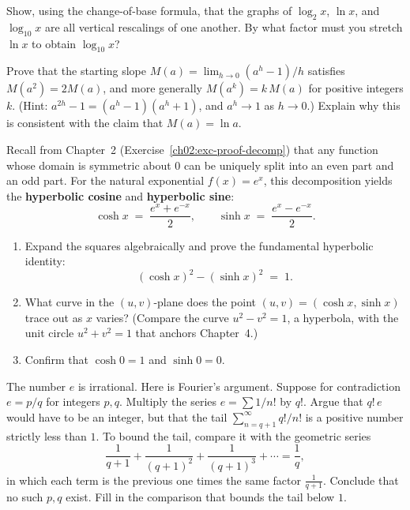 \begin{exercise}
\label{ch03:exc-change-base}
Show, using the change-of-base formula, that the graphs of $\log_2 x$, $\ln x$, and $\log_{10}x$ are all vertical rescalings of one another. By what factor must you stretch $\ln x$ to obtain $\log_{10}x$?
\end{exercise}

\begin{exercise}
\label{ch03:exc-proof-slope}
Prove that the starting slope $M(a)=\lim_{h\to0}(a^h-1)/h$ satisfies $M(a^2)=2M(a)$, and more generally $M(a^k)=k\,M(a)$ for positive integers $k$. (Hint: $a^{2h}-1 = (a^h-1)(a^h+1)$, and $a^h\to 1$ as $h\to 0$.) Explain why this is consistent with the claim that $M(a)=\ln a$.
\end{exercise}

\begin{exercise}
\label{ch03:exc-hyperbolic}
Recall from Chapter~2 (Exercise~\ref{ch02:exc-proof-decomp}) that any function whose domain is symmetric about $0$ can be uniquely split into an even part and an odd part. For the natural exponential $f(x) = e^x$, this decomposition yields the \textbf{hyperbolic cosine} and \textbf{hyperbolic sine}:
\[
\cosh x \;=\; \frac{e^x + e^{-x}}{2}, \qquad \sinh x \;=\; \frac{e^x - e^{-x}}{2}.
\]
\begin{enumerate}[label=(\alph*)]
  \item Expand the squares algebraically and prove the fundamental hyperbolic identity:
  \[
  (\cosh x)^2 - (\sinh x)^2 \;=\; 1.
  \]
  \item What curve in the $(u,v)$-plane does the point $(u,v) = (\cosh x, \sinh x)$ trace out as $x$ varies? (Compare the curve $u^2 - v^2 = 1$, a hyperbola, with the unit circle $u^2 + v^2 = 1$ that anchors Chapter~4.)
  \item Confirm that $\cosh 0 = 1$ and $\sinh 0 = 0$.
\end{enumerate}
\end{exercise}

\begin{exercise}
\label{ch03:exc-challenge-fourier}
The number $e$ is irrational. Here is Fourier's argument. Suppose for contradiction $e=p/q$ for integers $p,q$. Multiply the series $e=\sum 1/n!$ by $q!$. Argue that $q!\,e$ would have to be an integer, but that the tail $\sum_{n=q+1}^{\infty} q!/n!$ is a positive number strictly less than $1$. To bound the tail, compare it with the geometric series
\[
\frac{1}{q+1}+\frac{1}{(q+1)^2}+\frac{1}{(q+1)^3}+\cdots = \frac{1}{q},
\]
in which each term is the previous one times the same factor $\tfrac{1}{q+1}$. Conclude that no such $p,q$ exist. Fill in the comparison that bounds the tail below $1$.
\end{exercise}
